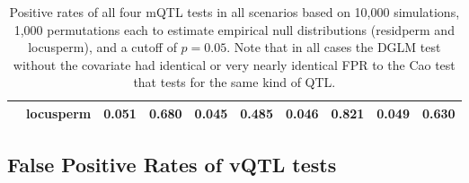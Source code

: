 \begin{table}[ht]
\begin{tabular}{p{2cm}ll llll lll}
           & locusperm & 0.051 & 0.680 & 0.045 & 0.485 & 0.046 & 0.821 & 0.049 & 0.630 \\ 
        \hline
      \end{tabular}
      \caption[
        Positive rates of mQTL tests in extended scenarios.
      ]
      {
        Positive rates of all four mQTL tests in all scenarios based on 10,000 simulations, 1,000 permutations each to estimate empirical null distributions (residperm and locusperm), and a cutoff of $p = 0.05$.
        Note that in all cases the DGLM test without the covariate had identical or very nearly identical FPR to the Cao test that tests for the same kind of QTL.
      }
      \label{tab:mqtl_fpr}
  \end{table}


\FloatBarrier
\clearpage
\subsection{False Positive Rates of vQTL tests}

  \renewcommand{\arraystretch}{1.0}

